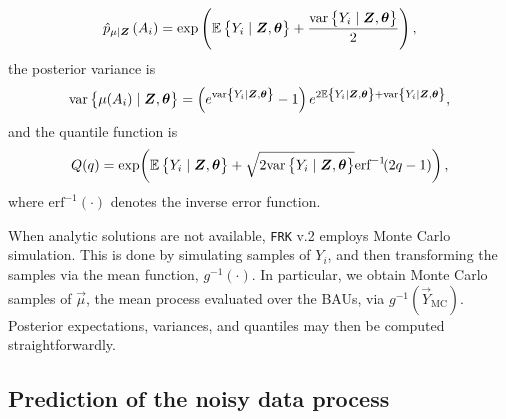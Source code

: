 \documentclass[12pt,a4paper]{article}
\begin{document}
\begin{appendices}
\[
    \pmugivenZ{A_i}
    =
    \exp\left(\ECurly{Y_i \mid \vec{Z}, \vec{\theta}} + \frac{\varCurly{Y_i \mid \vec{Z}, \vec{\theta}}}{2}\right),
\]
the posterior variance is
\[
    \varCurly{\muZgivenY{A_i} \mid \vec{Z}, \vec{\theta}}
    =
    \left(e^{\varCurly{Y_i \mid \vec{Z}, \vec{\theta}}}-1\right)
    e^{2\ECurly{Y_i \mid \vec{Z}, \vec{\theta}}+\varCurly{Y_i \mid \vec{Z}, \vec{\theta}}},
\]
and the quantile function is
\[
Q(q)
=
\explr{
\ECurly{Y_i \mid \vec{Z}, \vec{\theta}} + \sqrt{2 \varCurly{Y_i \mid \vec{Z}, \vec{\theta}}}
\text{erf}^{-1}\!(2q - 1)
},
\]
where $\text{erf}^{-1}\!(\cdot)$ denotes the inverse error function.


When analytic solutions are not available, \texttt{FRK} v.2 employs Monte Carlo simulation. 
This is done by simulating samples of $Y_i$, and then transforming the samples via the mean function, $g^{-1}(\cdot)$. 
 In particular, we obtain Monte Carlo samples of $\vec{\mu}$, the mean process evaluated over the BAUs, via $g^{-1}(\vec{Y}_{\text{MC}})$. 
 Posterior expectations, variances, and quantiles may then be computed straightforwardly. 
 










\subsection{Prediction of the noisy data process}


\end{appendices}
\end{document}
